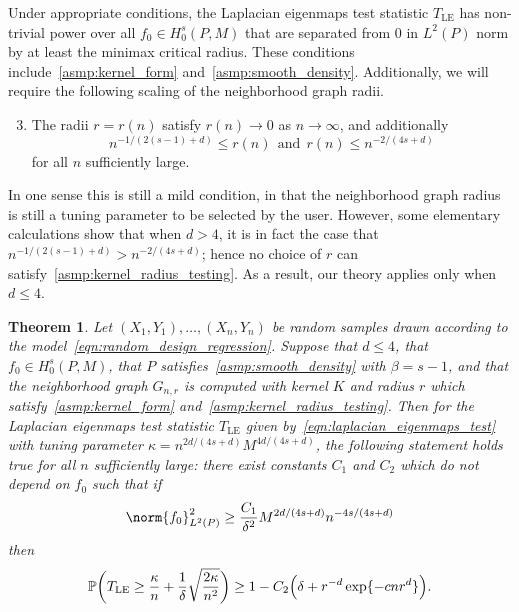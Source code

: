 \documentclass{article}
\newcommand{\1}{\mathbf{1}}
\newcommand{\Leb}{L}
\newcommand{\Pbb}{\mathbb{P}}
\newcommand{\LE}{\mathrm{LE}}
\theoremstyle{alden}
\theoremstyle{aldenthm}
\newtheorem{theorem}{Theorem}
\theoremstyle{definition}
\theoremstyle{remark}
\begin{document}
Under appropriate conditions, the Laplacian eigenmaps test statistic $T_{\LE}$ has non-trivial power over all $f_0 \in H_0^s(P,M)$ that are separated from $0$ in $\Leb^2(P)$ norm by at least the minimax critical radius. These conditions include~\ref{asmp:kernel_form} and~\ref{asmp:smooth_density}. Additionally, we will require the following scaling of the neighborhood graph radii.
\begin{enumerate}[label=(K\arabic*)]
	\setcounter{enumi}{2}
	\item 
	\label{asmp:kernel_radius_testing}
	The radii $r = r(n)$ satisfy $r(n) \to 0$ as $n \to \infty$, and additionally
	\begin{equation*}
	n^{-1/(2(s - 1) + d)} \leq r(n)~~\textrm{and}~~ r(n) \leq n^{-2/(4s + d)}
	\end{equation*}
	for all $n$ sufficiently large.
\end{enumerate}
In one sense this is still a mild condition, in that the neighborhood graph radius is still a tuning parameter to be selected by the user. However, some elementary calculations show that when $d > 4$, it is in fact the case that $n^{-1/(2(s - 1) + d)} > n^{-2/(4s + d)}$; hence no choice of $r$ can satisfy~\ref{asmp:kernel_radius_testing}. As a result, our theory applies only when $d \leq 4$.

\begin{theorem}
	\label{thm:laplacian_eigenmaps_testing}
	Let $(X_1,Y_1),\ldots,(X_n,Y_n)$ be random samples drawn according to the model~\eqref{eqn:random_design_regression}. Suppose that $d \leq 4$, that $f_0 \in H_0^s(P,M)$, that
	$P$ satisfies~\ref{asmp:smooth_density} with $\beta = s - 1$, and that the neighborhood graph $G_{n,r}$ is computed with kernel $K$ and radius $r$ which satisfy~\ref{asmp:kernel_form} and~\ref{asmp:kernel_radius_testing}.
	Then for the Laplacian eigenmaps test statistic $T_{\LE}$ given by~\eqref{eqn:laplacian_eigenmaps_test} with tuning parameter $\kappa = n^{2d/(4s + d)} M^{4d/(4s + d)}$, the following statement holds true for all $n$ sufficiently large: there exist constants $C_1$ and $C_2$ which do not depend on $f_0$ such that if
	\begin{equation}
	\label{eqn:laplacian_eigenmaps_testing}
	\norm{f_0}_{\Leb^2(P)}^2 \geq \frac{C_1}{\delta^2} M^{2d/(4s + d)} n^{-4s/(4s + d)}
	\end{equation}
	then
	\begin{equation*}
	\Pbb \biggl(T_{\LE} \geq \frac{\kappa}{n} + \frac{1}{\delta}\sqrt{\frac{2\kappa}{n^2}}\biggr) \geq 1 - C_2\Bigl(\delta + r^{-d} \exp\{- c n r^d\}\Bigr).
	\end{equation*}
\end{theorem}
\end{document}
